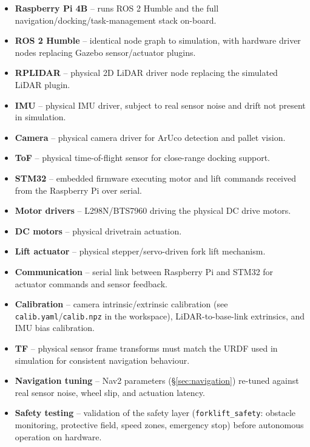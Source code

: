 \documentclass[a4paper, 12pt]{article}
\begin{document}
\begin{itemize}
    \item \textbf{Raspberry Pi 4B} -- runs ROS 2 Humble and the full
    navigation/docking/task-management stack on-board.
    \item \textbf{ROS 2 Humble} -- identical node graph to simulation,
    with hardware driver nodes replacing Gazebo sensor/actuator
    plugins.
    \item \textbf{RPLIDAR} -- physical 2D LiDAR driver node replacing
    the simulated LiDAR plugin.
    \item \textbf{IMU} -- physical IMU driver, subject to real sensor
    noise and drift not present in simulation.
    \item \textbf{Camera} -- physical camera driver for ArUco detection
    and pallet vision.
    \item \textbf{ToF} -- physical time-of-flight sensor for close-range
    docking support.
    \item \textbf{STM32} -- embedded firmware executing motor and lift
    commands received from the Raspberry Pi over serial.
    \item \textbf{Motor drivers} -- L298N/BTS7960 driving the physical
    DC drive motors.
    \item \textbf{DC motors} -- physical drivetrain actuation.
    \item \textbf{Lift actuator} -- physical stepper/servo-driven fork
    lift mechanism.
    \item \textbf{Communication} -- serial link between Raspberry Pi and
    STM32 for actuator commands and sensor feedback.
    \item \textbf{Calibration} -- camera intrinsic/extrinsic calibration
    (see \texttt{calib.yaml}/\texttt{calib.npz} in the workspace),
    LiDAR-to-base-link extrinsics, and IMU bias calibration.
    \item \textbf{TF} -- physical sensor frame transforms must match
    the URDF used in simulation for consistent navigation behaviour.
    \item \textbf{Navigation tuning} -- Nav2 parameters
    (\S\ref{sec:navigation}) re-tuned against real sensor noise,
    wheel slip, and actuation latency.
    \item \textbf{Safety testing} -- validation of the safety layer
    (\texttt{forklift\_safety}: obstacle monitoring, protective field,
    speed zones, emergency stop) before autonomous operation on
    hardware.
\end{itemize}
\end{document}
